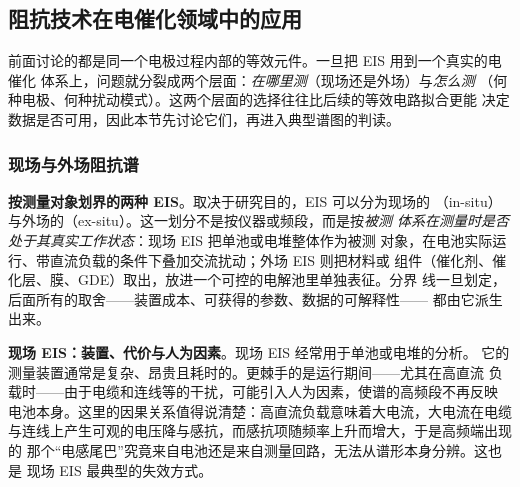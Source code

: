 %

\subsection{阻抗技术在电催化领域中的应用}


前面讨论的都是同一个电极过程内部的等效元件。一旦把 EIS 用到一个真实的电催化
体系上，问题就分裂成两个层面：\emph{在哪里测}（现场还是外场）与\emph{怎么测}
（何种电极、何种扰动模式）。这两个层面的选择往往比后续的等效电路拟合更能
决定数据是否可用，因此本节先讨论它们，再进入典型谱图的判读。

\subsubsection{现场与外场阻抗谱}

\begin{principle}
\textbf{按测量对象划界的两种 EIS}。取决于研究目的，EIS 可以分为现场的
（in-situ）与外场的（ex-situ）。这一划分不是按仪器或频段，而是按\emph{被测
体系在测量时是否处于其真实工作状态}：现场 EIS 把单池或电堆整体作为被测
对象，在电池实际运行、带直流负载的条件下叠加交流扰动；外场 EIS 则把材料或
组件（催化剂、催化层、膜、GDE）取出，放进一个可控的电解池里单独表征。分界
线一旦划定，后面所有的取舍——装置成本、可获得的参数、数据的可解释性——
都由它派生出来。
\end{principle}

\begin{measure}
\textbf{现场 EIS：装置、代价与人为因素}。现场 EIS 经常用于单池或电堆的分析。
它的测量装置通常是复杂、昂贵且耗时的。更棘手的是运行期间——尤其在高直流
负载时——由于电缆和连线等的干扰，可能引入人为因素，使谱的高频段不再反映
电池本身。这里的因果关系值得说清楚：高直流负载意味着大电流，大电流在电缆
与连线上产生可观的电压降与感抗，而感抗项随频率上升而增大，于是高频端出现的
那个“电感尾巴”究竟来自电池还是来自测量回路，无法从谱形本身分辨。这也是
现场 EIS 最典型的失效方式。
\end{measure}

